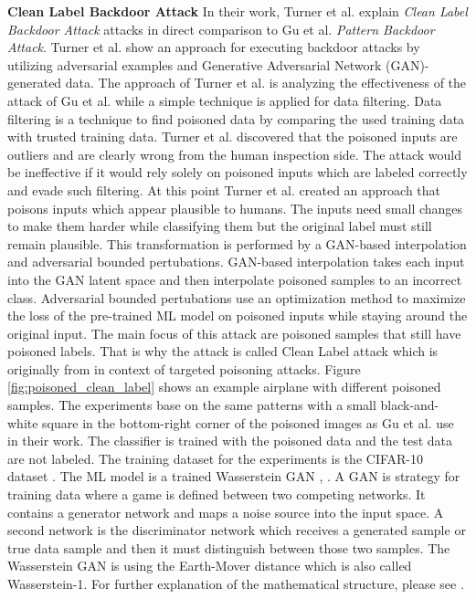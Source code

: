\textbf{Clean Label Backdoor Attack} In their work, Turner et al. \cite{turner2018clean} explain \textit{Clean Label Backdoor Attack} attacks in direct comparison to Gu et al. \textit{Pattern Backdoor Attack}. Turner et al. show an approach for executing backdoor attacks by utilizing adversarial examples and Generative Adversarial Network (GAN)-generated data. The approach of Turner et al. is analyzing the effectiveness of the attack of Gu et al. while a simple technique is applied for data filtering. Data filtering is a technique to find poisoned data by comparing the used training data with trusted training data. Turner et al. discovered that the poisoned inputs are outliers and are clearly wrong from the human inspection side. The attack would be ineffective if it would rely solely on poisoned inputs which are labeled correctly and evade such filtering. At this point Turner et al. created an approach that poisons inputs which appear plausible to humans. The inputs need small changes to make them harder while classifying them but the original label must still remain plausible. This transformation is performed by a GAN-based interpolation and adversarial bounded pertubations. GAN-based interpolation takes each input into the GAN latent space \cite{DBLP:conf/nips/GoodfellowPMXWOCB14} and then interpolate poisoned samples to an incorrect class. Adversarial bounded pertubations use an optimization method to maximize the loss of the pre-trained ML model on poisoned inputs while staying around the original input. The main focus of this attack are poisoned samples that still have poisoned labels. That is why the attack is called Clean Label attack which is originally from \cite{DBLP:journals/corr/abs-1804-00792} in context of targeted poisoning attacks. Figure \ref{fig:poisoned_clean_label} shows an example airplane with different poisoned samples. The experiments base on the same patterns with a small black-and-white square in the bottom-right corner of the poisoned images as Gu et al. use in their work. The classifier is trained with the poisoned data and the test data are not labeled. The training dataset for the experiments
is the CIFAR-10 dataset \cite{Krizhevsky2009LearningML}. The ML model is a trained Wasserstein GAN \cite{DBLP:journals/corr/ArjovskyCB17}, \cite{DBLP:conf/nips/GulrajaniAADC17}. A GAN is strategy for training data where a game is defined between two competing networks. It contains a generator network and maps a noise source into the input space. A second network is the discriminator network which receives a generated sample or true data sample and then it must distinguish between those two samples. The Wasserstein GAN is using the Earth-Mover distance which is also called Wasserstein-1. For
further explanation of the mathematical structure, please see \cite{DBLP:journals/corr/GulrajaniAADC17}.

